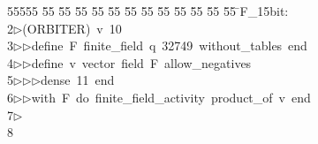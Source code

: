 %
%
\begin{tabbing}
55555 \= 55 \= 55 \= 55 \= 55 \= 55 \= 55 \= 55 \= 55 \= 55 \= 55 \= 55 \= 55 \= \>F\_15bit:\\[0pt]
2\>$\triangleright$\>(ORBITER)\ v\ 10\ \\[0pt]
3\>$\triangleright$\>$\triangleright$\>define\ F\ finite\_field\ q\ 32749\ without\_tables\ end\ \\[0pt]
4\>$\triangleright$\>$\triangleright$\>define\ v\ vector\ field\ F\ allow\_negatives\ \\[0pt]
5\>$\triangleright$\>$\triangleright$\>$\triangleright$\>dense\ 11\ end\ \\[0pt]
6\>$\triangleright$\>$\triangleright$\>with\ F\ do\ finite\_field\_activity\ product\_of\ v\ end\\[0pt]
7\>$\triangleright$\>\\[0pt]
8\>\end{tabbing}
